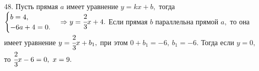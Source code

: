 48. Пусть прямая $a$ имеет уравнение $y=kx+b,$ тогда $\begin{cases}b=4,\\-6a+4=0.\end{cases}\Rightarrow y=\cfrac{2}{3}x+4.$ Если прямая $b$ параллельна прямой $a,$ то она имеет уравнение $y=\cfrac{2}{3}x+b_1,$ при этом $0+b_1=-6,\ b_1=-6.$ Тогда если $y=0,$ то $\cfrac{2}{3}x-6=0,\ x=9.$\\
